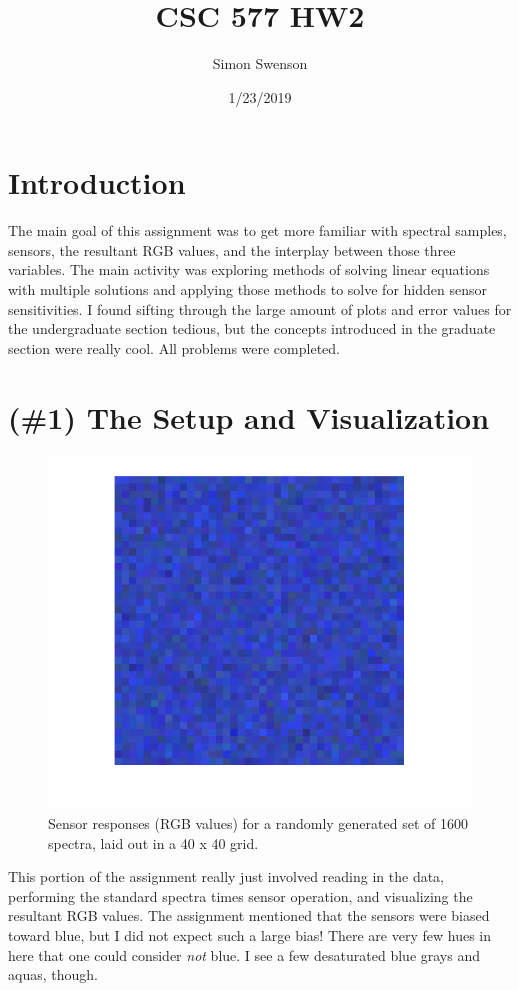 \documentclass{article}
\title{CSC 577 HW2}
\date{1/23/2019}
\author{Simon Swenson}
\begin{document}
\maketitle
{}

\section{Introduction}

The main goal of this assignment was to get more familiar with spectral samples, 
sensors, the resultant RGB values, and the interplay between those three 
variables. The main activity was exploring methods of solving 
linear equations with multiple solutions and applying those methods to solve for 
hidden sensor sensitivities. I found sifting through the large amount of plots and
error values  for the undergraduate section tedious, but the concepts introduced in the graduate section 
were really cool. All problems were completed.

\section{(\#1) The Setup and Visualization}

\begin{figure}[!ht]
	\centering
	\includegraphics[width=120mm]{figs/image.png}
	\caption{Sensor responses (RGB values) for a randomly generated set of 1600 spectra, laid out in a 40 x 40 grid.}
\end{figure}

This portion of the assignment really just involved reading in the data, performing the 
standard spectra times sensor operation, and visualizing the resultant RGB values. 
The assignment mentioned that the sensors were biased toward blue, but I did not 
expect such a large bias! There are very few hues in here that one could consider 
\textit{not} blue. I see a few desaturated blue grays and aquas, though.
\end{document}
